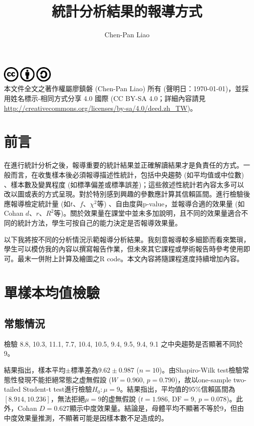 \documentclass[12pt, a4paper, onecolumn]{article}
\title{統計分析結果的報導方式}
\author{Chen-Pan Liao}
\begin{document}
\maketitle

\noindent\includegraphics[width=1in]{cc.pdf}\\[2pt]
本文件全文之著作權屬廖鎮磐 (Chen-Pan Liao) 所有 (聲明日：\today)，並採用姓名標示-相同方式分享 4.0 國際 (CC BY-SA 4.0；詳細內容請見 \url{http://creativecommons.org/licenses/by-sa/4.0/deed.zh_TW})。

\tableofcontents

\section{前言}
在進行統計分析之後，報導重要的統計結果並正確解讀結果才是負責任的方式。一般而言，在收隻樣本後必須報導描述性統計，包括中央趨勢 (如平均值或中位數) 、樣本數及變異程度 (如標準偏差或標準誤差)；這些敘述性統計若內容太多可以改以圖或表的方式呈現。對於特別感到興趣的參數應計算其信賴區間。進行檢驗後應報導檢定統計量 (如$t$、$f$、$\chi^2$等) 、自由度與p-value，並報導合適的效果量 (如Cohan $d$、$r$、$R^2$等)。關於效果量在課堂中並未多加說明，且不同的效果量適合不同的統計方法，學生可按自己的能力決定是否報導效果量。

以下我將按不同的分析情況示範報導分析結果。我刻意報導較多細節而看來繁瑣，學生可以模仿我的內容以撰寫報告作業，但未來其它課程或學術報告時參考使用即可。最末一併附上計算及繪圖之R code。本文內容將隨課程進度持續增加內容。



\section{單樣本均值檢驗}
\subsection{常態情況}
檢驗 8.8, 10.3, 11.1, 7.7, 10.4, 10.5, 9.4, 9.5, 9.4, 9.1 之中央趨勢是否顯著不同於9。

結果指出，樣本平均$\pm$標準差為$9.62 \pm 0.987$ ($n = 10$)。由Shapiro-Wilk test檢驗常態性發現不能拒絕常態之虚無假設 ($W = 0.960$, $p = 0.790$)，故以one-sample two-tailed Student-t test進行檢驗$H_0: \mu=9$。結果指出，平均值的95\%信賴區間為$\left[8.914, 10.236\right]$，無法拒絕$\mu = 9$的虚無假說 ($t = 1.986$, $\text{DF} = 9$, $p = 0.078$)。此外，Cohan $D = 0.627$顯示中度效果量。結論是，母體平均不顯著不等於9，但由中度效果量推測，不顯著可能是因樣本數不足造成的。
\end{document}
